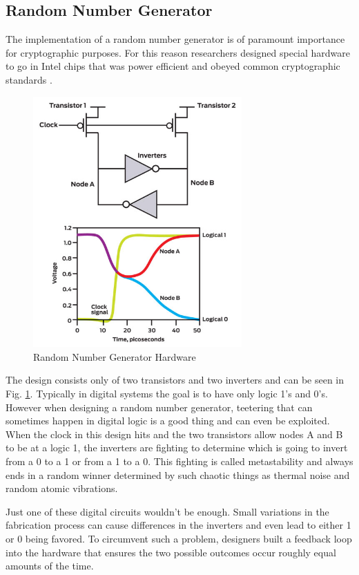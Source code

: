 \documentclass[journal]{IEEEtran}
\begin{document}
\subsection{Random Number Generator}

The implementation of a random number generator is of paramount importance for cryptographic purposes.  For this reason researchers designed special hardware to go in Intel chips that was power efficient and obeyed common cryptographic standards \cite{IEEERNG}.

\begin{figure}[htbp]
	\centering
	\includegraphics[width=8cm,keepaspectratio]{img/transistorRNG.png}
	\caption{Random Number Generator Hardware \cite{IEEERNG} }
	\label{transistorFig}
\end{figure}

The design consists only of two transistors and two inverters and can be seen in Fig. \ref{transistorFig}.  Typically in digital systems the goal is to have only logic 1's and 0's.  However when designing a random number generator, teetering that can sometimes happen in digital logic is a good thing and can even be exploited.  When the clock in this design hits and the two transistors allow nodes A and B to be at a logic 1, the inverters are fighting to determine which is going to invert from a 0 to a 1 or from a 1 to a 0.  This fighting is called metastability and always ends in a random winner determined by such chaotic things as thermal noise and random atomic vibrations.

Just one of these digital circuits wouldn't be enough.  Small variations in the fabrication process can cause differences in the inverters and even lead to either 1 or 0 being favored.  To circumvent such a problem, designers built a feedback loop into the hardware that ensures the two possible outcomes occur roughly equal amounts of the time.
\end{document}
